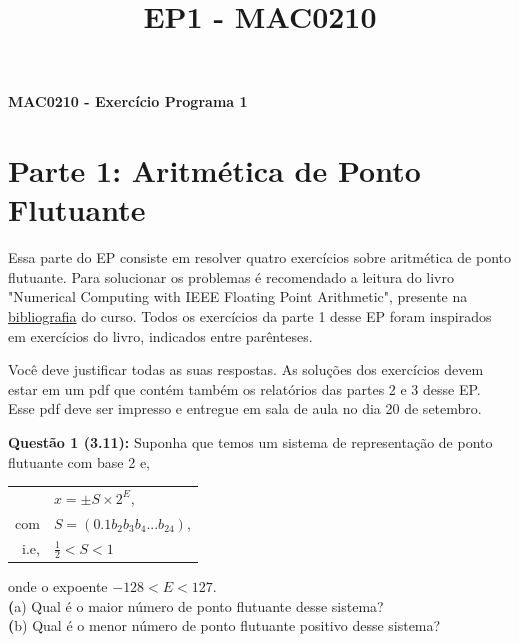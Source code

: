 \documentclass[12pt]{article}
\newcommand{\questao}[1] {\vspace{12pt} \noindent \large \textbf{Questão #1:} \normalsize}
\renewcommand{\part}[1] {\noindent\textbf (#1)}
\begin{document}
\title{EP1 - MAC0210}
\begin{flushleft}
    \textbf{\fontsize{20pt}{2em}\selectfont 
        MAC0210 - Exercício Programa 1\\}
    \fontsize{10pt}{1em}
\end{flushleft}


\section {Parte 1: Aritmética de Ponto Flutuante}
    Essa parte do EP consiste em resolver quatro exercícios sobre 
aritmética de ponto flutuante. Para solucionar os problemas é
recomendado a leitura do livro "Numerical Computing with IEEE Floating
Point Arithmetic", presente na 
\href{http://www.ime.usp.br/~egbirgin/courses/mac210/biblio.html}
{bibliografia} do 
curso. Todos os exercícios da parte 1 desse EP foram inspirados em 
exercícios do livro, indicados entre parênteses.

    Você deve justificar todas as suas respostas. As soluções dos 
exercícios devem estar em um pdf que contém também os relatórios das
partes 2 e 3 desse EP. Esse pdf deve ser impresso e entregue em sala de
aula no dia 20 de setembro.

\questao{1 (3.11)} 
Suponha que temos um sistema de representação de ponto flutuante com
base 2 e,
\begin{center}
    \begin{tabular}{r l}
             & $x = \pm S \times 2^E$,\\ 
        com  & $S = (0.1b_2b_3b_4...b_{24})$, \\
        i.e, & $\frac{1}{2} < S < 1$
    \end{tabular}
\end{center}
onde o expoente $-128 < E < 127$. \\ 
\part{a} Qual é o maior número de ponto flutuante desse sistema? \\
\part{b} Qual é o menor número de ponto flutuante positivo desse 
sistema? \\
\end{document}
